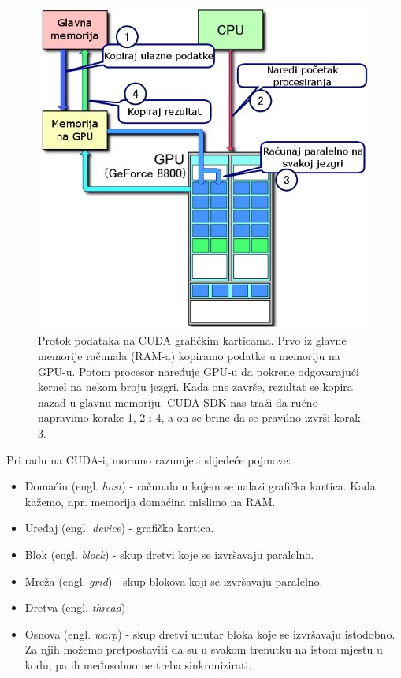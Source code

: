 \documentclass[times, utf8, zavrsni]{fer}
\begin{document}
\begin{figure}
\centering
\includegraphics[scale=0.7]{res/CUDA_processing_flow_(hr).PNG}
\caption[Protok podataka na CUDA grafičkim karticama]{Protok podataka
na CUDA grafičkim karticama. Prvo iz glavne memorije računala (RAM-a)
kopiramo podatke u memoriju na GPU-u. Potom procesor naređuje
GPU-u da pokrene odgovarajući kernel na nekom broju jezgri. 
Kada one završe, rezultat se kopira nazad u glavnu memoriju.
CUDA SDK nas traži da ručno napravimo korake 1, 2 i 4, a on
se brine da se pravilno izvrši korak 3.}
\label{figure:cuda:dataflow}
\end{figure}


Pri radu na CUDA-i, moramo razumjeti slijedeće pojmove:
\begin{itemize}
\item
Domaćin (engl. \textit{host}) - računalo u kojem se nalazi grafička kartica.
Kada kažemo, npr. memorija domaćina mislimo na RAM. 

\item
Uređaj (engl. \textit{device}) - grafička kartica.

\item
Blok (engl. \textit{block}) - skup dretvi koje se izvršavaju
paralelno. 

\item
Mreža (engl. \textit{grid}) - skup blokova koji se izvršavaju paralelno.

\item
Dretva (engl. \textit{thread}) - 

\item
Osnova (engl. \textit{warp}) - skup dretvi unutar bloka koje
se izvršavaju istodobno. Za njih možemo pretpostaviti
da su u svakom trenutku na istom mjestu u kodu, pa ih 
međusobno ne treba sinkronizirati. 

\end{itemize}
\end{document}

